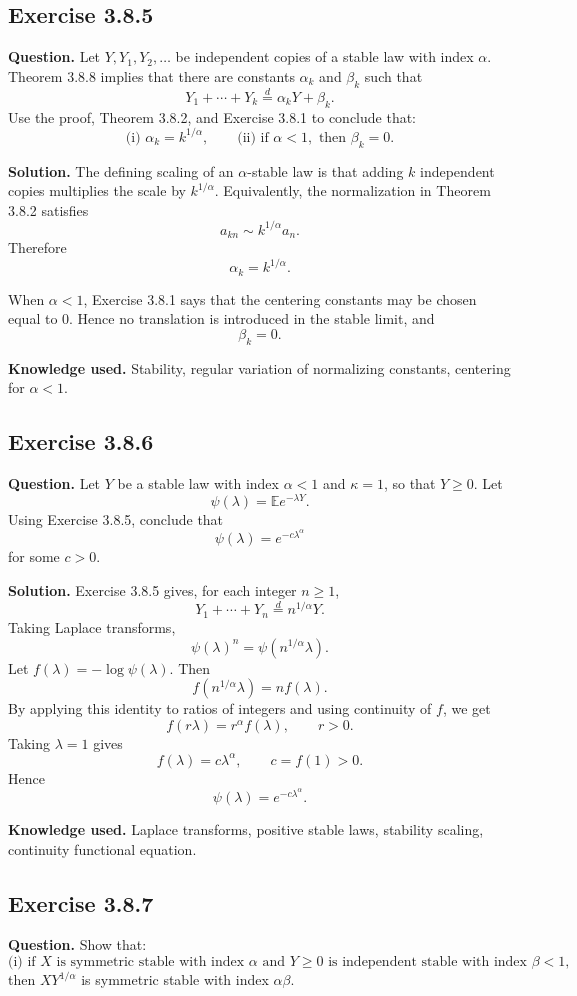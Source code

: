 \documentclass[11pt]{article}
\newcommand{\E}{\mathbb{E}}
\begin{document}
\subsection*{Exercise 3.8.5}
\textbf{Question.}
Let $Y,Y_1,Y_2,\ldots$ be independent copies of a stable law with index
$\alpha$.  Theorem 3.8.8 implies that there are constants $\alpha_k$ and
$\beta_k$ such that
\[
  Y_1+\cdots+Y_k\stackrel{d}{=}\alpha_kY+\beta_k.
\]
Use the proof, Theorem 3.8.2, and Exercise 3.8.1 to conclude that:
\[
  \text{(i) }\alpha_k=k^{1/\alpha},
  \qquad
  \text{(ii) if }\alpha<1,\text{ then }\beta_k=0.
\]

\textbf{Solution.}
The defining scaling of an $\alpha$-stable law is that adding $k$
independent copies multiplies the scale by $k^{1/\alpha}$.  Equivalently,
the normalization in Theorem 3.8.2 satisfies
\[
  a_{kn}\sim k^{1/\alpha}a_n.
\]
Therefore
\[
  \alpha_k=k^{1/\alpha}.
\]

When $\alpha<1$, Exercise 3.8.1 says that the centering constants may be
chosen equal to $0$.  Hence no translation is introduced in the stable
limit, and
\[
  \beta_k=0.
\]

\textbf{Knowledge used.}
Stability, regular variation of normalizing constants, centering for
$\alpha<1$.

\subsection*{Exercise 3.8.6}
\textbf{Question.}
Let $Y$ be a stable law with index $\alpha<1$ and $\kappa=1$, so that
$Y\ge0$.  Let
\[
  \psi(\lambda)=\E e^{-\lambda Y}.
\]
Using Exercise 3.8.5, conclude that
\[
  \psi(\lambda)=e^{-c\lambda^\alpha}
\]
for some $c>0$.

\textbf{Solution.}
Exercise 3.8.5 gives, for each integer $n\ge1$,
\[
  Y_1+\cdots+Y_n\stackrel{d}{=}n^{1/\alpha}Y.
\]
Taking Laplace transforms,
\[
  \psi(\lambda)^n=\psi(n^{1/\alpha}\lambda).
\]
Let $f(\lambda)=-\log\psi(\lambda)$.  Then
\[
  f(n^{1/\alpha}\lambda)=nf(\lambda).
\]
By applying this identity to ratios of integers and using continuity of
$f$, we get
\[
  f(r\lambda)=r^\alpha f(\lambda),\qquad r>0.
\]
Taking $\lambda=1$ gives
\[
  f(\lambda)=c\lambda^\alpha,\qquad c=f(1)>0.
\]
Hence
\[
  \psi(\lambda)=e^{-c\lambda^\alpha}.
\]

\textbf{Knowledge used.}
Laplace transforms, positive stable laws, stability scaling, continuity
functional equation.

\subsection*{Exercise 3.8.7}
\textbf{Question.}
Show that:
\[
  \text{(i) if }X\text{ is symmetric stable with index }\alpha
  \text{ and }Y\ge0\text{ is independent stable with index }\beta<1,
\]
then $XY^{1/\alpha}$ is symmetric stable with index $\alpha\beta$.
\end{document}
